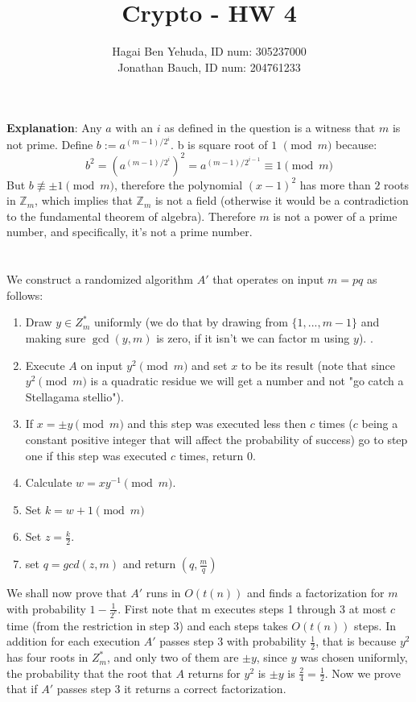 \documentclass{article}
\title{Crypto - HW 4}
\author{Hagai Ben Yehuda, ID num: 305237000\\ Jonathan Bauch, ID num: 204761233}
\date{}
\begin{document}
  \maketitle

\section{} %


\textbf{Explanation}: Any $a$ with an $i$ as defined in the question is a witness that $m$ is not prime. Define $b := a^{(m-1)/2^i}$.
b is square  root of $1$ $\pmod{m}$ because:
\[ b^2 = (a^{(m-1)/2^i})^2 = a^{(m-1)/2^{i-1}} \equiv 1 \pmod{m} \]
But $b \not \equiv \pm 1 \pmod{m}$, therefore the polynomial $(x-1)^2$ has more than $2$ roots in $\mathbb{Z}_m$, which implies that $\mathbb{Z}_m$ is not a field (otherwise it would be a contradiction to the fundamental theorem of algebra). Therefore $m$ is not a power of a prime number, and specifically, it's not a prime number. 

\section{} %
We construct a randomized algorithm $A'$ that operates on input $m = pq$ as follows:
\begin{enumerate}
\item Draw $y\in Z_{m}^{*}$ uniformly (we do that by drawing from $\{1,...,m-1\}$ and making sure $\gcd(y,m)$ is zero, if it isn't we can factor m using $y$). .
\item Execute $A$ on input $y^2 \pmod m $ and set $x$ to be its result (note that since $y^2 \pmod m $ is a quadratic residue we will get a number and not  "go catch a Stellagama stellio"). 
\item If $x = \pm y \pmod m$ and this step was executed less then $c$ times ($c$ being a constant positive integer that will affect the probability of success) go to step one if this step was executed $c$ times, return $0$.
\item Calculate $w = x  y^{-1} \pmod m$.
\item Set $k = w+1 \pmod m$ 
\item Set $z = \frac{k}{2}$.
\item set $q = gcd(z, m)$ and return $(q, \frac{m}{q})$
\end{enumerate} 
We shall now prove that $A'$ runs in $O(t(n))$ and finds a factorization for $m$ with probability $ 1- \frac{1}{2^c}$.
First note that m executes steps 1 through 3 at most $c$ time (from the restriction in step 3) and each steps takes $O(t(n))$ steps.
In addition for each execution $A'$ passes step $3$ with probability $\frac{1}{2}$, that is because $y^2$ has four roots in $Z_{m}^{*}$, and only two of them are $\pm y$, since $y$ was chosen uniformly, the probability that the root that $A$ returns for $y^2$ is $ \pm y$  is  $\frac{2}{4} = \frac{1}{2}$.
Now we prove that if $A'$ passes step 3 it returns a correct factorization.
\end{document}
